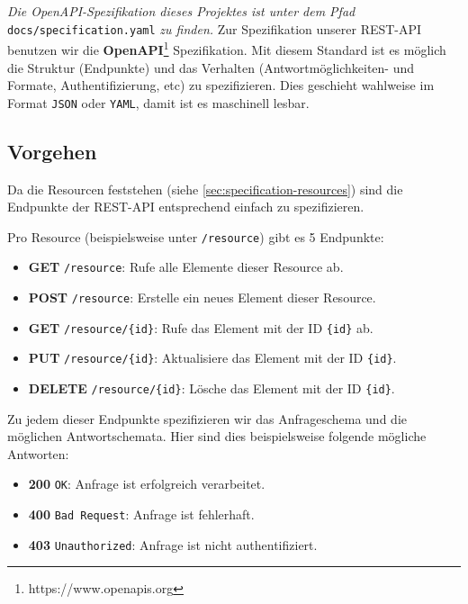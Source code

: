 \textit{Die OpenAPI-Spezifikation dieses Projektes ist unter dem Pfad} \texttt{docs/specification.yaml} \textit{zu finden.}
\newline
\newline
Zur Spezifikation unserer REST-API benutzen wir die \textbf{OpenAPI}\footnote{https://www.openapis.org} Spezifikation.
Mit diesem Standard ist es möglich die Struktur (Endpunkte) und das Verhalten (Antwortmöglichkeiten- und Formate, Authentifizierung, etc) zu spezifizieren.
Dies geschieht wahlweise im Format \texttt{JSON} oder \texttt{YAML}, damit ist es maschinell lesbar.

\subsection{Vorgehen}

Da die Resourcen feststehen (siehe \ref{sec:specification-resources}) sind die Endpunkte der REST-API entsprechend einfach zu spezifizieren. 

Pro Resource (beispielsweise unter \texttt{/resource}) gibt es 5 Endpunkte:
\begin{itemize}
    \item \textbf{GET} \texttt{/resource}: Rufe alle Elemente dieser Resource ab.
    \item \textbf{POST} \texttt{/resource}: Erstelle ein neues Element dieser Resource.
    \item \textbf{GET} \texttt{/resource/\{id\}}: Rufe das Element mit der ID \texttt{\{id\}} ab.
    \item \textbf{PUT} \texttt{/resource/\{id\}}: Aktualisiere das Element mit der ID \texttt{\{id\}}.
    \item \textbf{DELETE} \texttt{/resource/\{id\}}: Lösche das Element mit der ID \texttt{\{id\}}.
\end{itemize}

Zu jedem dieser Endpunkte spezifizieren wir das Anfrageschema und die möglichen Antwortschemata. Hier sind dies beispielsweise folgende mögliche Antworten:

\begin{itemize}
    \item \textbf{200} \texttt{OK}: Anfrage ist erfolgreich verarbeitet.
    \item \textbf{400} \texttt{Bad Request}: Anfrage ist fehlerhaft.
    \item \textbf{403} \texttt{Unauthorized}: Anfrage ist nicht authentifiziert.
\end{itemize}

